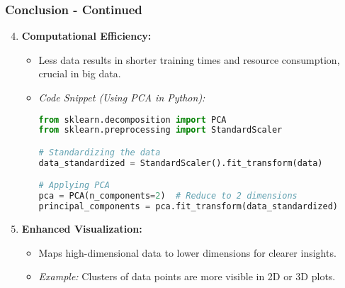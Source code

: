 \documentclass[aspectratio=169]{beamer}
\begin{document}
\begin{frame}[fragile]
    \frametitle{Conclusion - Continued}

    \begin{enumerate}
        \setcounter{enumi}{3}
        \item \textbf{Computational Efficiency:}
            \begin{itemize}
                \item Less data results in shorter training times and resource consumption, crucial in big data.
                \item \textit{Code Snippet (Using PCA in Python):}
                \begin{lstlisting}[language=Python]
from sklearn.decomposition import PCA
from sklearn.preprocessing import StandardScaler

# Standardizing the data
data_standardized = StandardScaler().fit_transform(data)

# Applying PCA
pca = PCA(n_components=2)  # Reduce to 2 dimensions
principal_components = pca.fit_transform(data_standardized)
                \end{lstlisting}
            \end{itemize}
        
        \item \textbf{Enhanced Visualization:}
            \begin{itemize}
                \item Maps high-dimensional data to lower dimensions for clearer insights.
                \item \textit{Example:} Clusters of data points are more visible in 2D or 3D plots.
            \end{itemize}
    \end{enumerate}
\end{frame}
\end{document}
